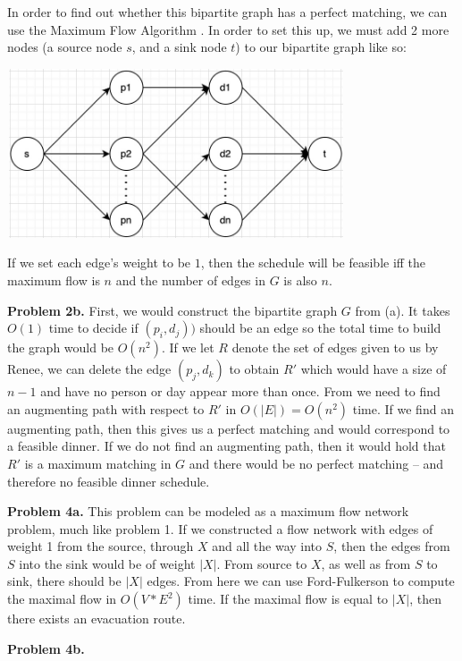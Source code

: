 \documentclass{article}
\begin{document}
In order to find out whether this bipartite graph has a perfect matching, we can use the Maximum Flow Algorithm \cite{website:2}. In order to set this up, we must add 2 more nodes (a source node $s$, and a sink node $t$) to our bipartite graph like so:

\begin{center}
    \includegraphics[width=10cm, height=5cm]{images/maximum-flow-graph.jpg}
\end{center}

If we set each edge's weight to be $1$, then the schedule will be feasible iff the maximum flow is $n$ and the number of edges in $G$ is also $n$.

\hfill

\textbf{Problem 2b.} First, we would construct the bipartite graph $G$ from (a). It takes $O(1)$ time to decide if $(p_i, d_j))$ should be an edge so the total time to build the graph would be $O(n^2)$. If we let $R$ denote the set of edges given to us by Renee, we can delete the edge $(p_j, d_k)$ to obtain $R'$ which would have a size of $n-1$ and have no person or day appear more than once. From \cite{website:3} we need to find an augmenting path with respect to $R'$ in $O(|E|) = O(n^2)$ time. If we find an augmenting path, then this gives us a perfect matching and would correspond to a feasible dinner. If we do not find an augmenting path, then it would hold that $R'$ is a maximum matching in $G$ and there would be no perfect matching -- and therefore no feasible dinner schedule. 

\hfill

\textbf{Problem 4a.} This problem can be modeled as a maximum flow network problem, much like problem 1. If we constructed a flow network with edges of weight 1 from the source, through $X$ and all the way into $S$, then the edges from $S$ into the sink would be of weight $|X|$. From source to $X$, as well as from $S$ to sink, there should be $|X|$ edges. From here we can use Ford-Fulkerson \cite{website:4} to compute the maximal flow in $O(V*E^2)$ time. If the maximal flow is equal to $|X|$, then there exists an evacuation route.

\hfill

\textbf{Problem 4b.} 

\newpage
 

\end{document}
